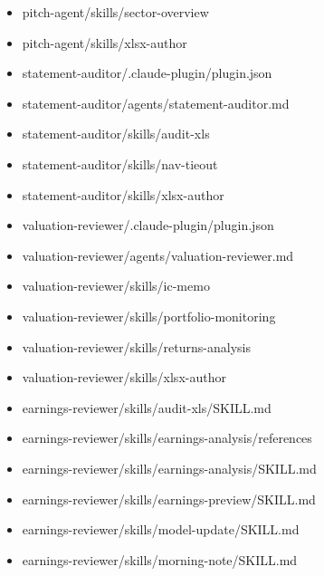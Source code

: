 \documentclass[11pt]{article}
\begin{document}
\begin{itemize}[leftmargin=*,itemsep=1pt,topsep=2pt]
\item \hspace*{1.8em}pitch-agent/skills/sector-overview
\item \hspace*{1.8em}pitch-agent/skills/xlsx-author
\item \hspace*{1.8em}statement-auditor/.claude-plugin/plugin.json
\item \hspace*{1.8em}statement-auditor/agents/statement-auditor.md
\item \hspace*{1.8em}statement-auditor/skills/audit-xls
\item \hspace*{1.8em}statement-auditor/skills/nav-tieout
\item \hspace*{1.8em}statement-auditor/skills/xlsx-author
\item \hspace*{1.8em}valuation-reviewer/.claude-plugin/plugin.json
\item \hspace*{1.8em}valuation-reviewer/agents/valuation-reviewer.md
\item \hspace*{1.8em}valuation-reviewer/skills/ic-memo
\item \hspace*{1.8em}valuation-reviewer/skills/portfolio-monitoring
\item \hspace*{1.8em}valuation-reviewer/skills/returns-analysis
\item \hspace*{1.8em}valuation-reviewer/skills/xlsx-author
\item \hspace*{2.7em}earnings-reviewer/skills/audit-xls/SKILL.md
\item \hspace*{2.7em}earnings-reviewer/skills/earnings-analysis/references
\item \hspace*{2.7em}earnings-reviewer/skills/earnings-analysis/SKILL.md
\item \hspace*{2.7em}earnings-reviewer/skills/earnings-preview/SKILL.md
\item \hspace*{2.7em}earnings-reviewer/skills/model-update/SKILL.md
\item \hspace*{2.7em}earnings-reviewer/skills/morning-note/SKILL.md

\end{itemize}
\end{document}

